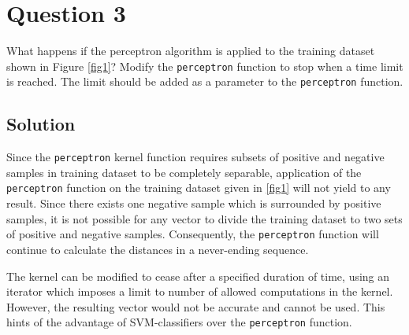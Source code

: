
\section*{Question 3}

What happens if the perceptron algorithm is applied to the training dataset shown in Figure \ref{fig1}? Modify the \texttt{perceptron} function to stop when a time limit is reached.
The limit should be added as a parameter to the \texttt{perceptron} function.

\subsection*{Solution}

Since the \texttt{perceptron} kernel function requires subsets of positive and negative samples in training dataset to be completely separable, application of the \texttt{perceptron} function on the training dataset given in \ref{fig1} will not yield to any result.
Since there exists one negative sample which is surrounded by positive samples, it is not possible for any vector to divide the training dataset to two sets of positive and negative samples.
Consequently, the \texttt{perceptron} function will continue to calculate the distances in a never-ending sequence.

The kernel can be modified to cease after a specified duration of time, using an iterator which imposes a limit to number of allowed computations in the kernel.
However, the resulting vector would not be accurate and cannot be used.
This hints of the advantage of SVM-classifiers over the \texttt{perceptron} function.
